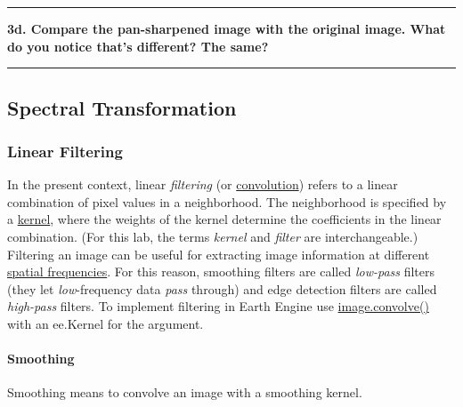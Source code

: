 \documentclass[
]{article}
\begin{document}
\begin{center}\rule{0.5\linewidth}{0.5pt}\end{center}

\textbf{3d. Compare the pan-sharpened image with the original image. What do you notice that's different? The same? }

\begin{center}\rule{0.5\linewidth}{0.5pt}\end{center}

\hypertarget{spectral-transformation}{%
\subsection{Spectral Transformation}\label{spectral-transformation}}

\hypertarget{linear-filtering}{%
\subsubsection{Linear Filtering}\label{linear-filtering}}

In the present context, linear \emph{filtering} (or \href{http://www.dspguide.com/ch24/1.htm}{convolution}) refers to a linear combination of pixel values in a neighborhood. The neighborhood is specified by a \href{https://en.wikipedia.org/wiki/Kernel_(image_processing)}{kernel}, where the weights of the kernel determine the coefficients in the linear combination. (For this lab, the terms \emph{kernel} and \emph{filter} are interchangeable.) Filtering an image can be useful for extracting image information at different \href{http://www.dspguide.com/ch24/5.htm}{spatial frequencies}. For this reason, smoothing filters are called \emph{low-pass} filters (they let \emph{low}-frequency data \emph{pass} through) and edge detection filters are called \emph{high-pass} filters. To implement filtering in Earth Engine use \href{https://developers.google.com/earth-engine/guides/image_convolutions}{image.convolve()} with an ee.Kernel for the argument.

\hypertarget{smoothing}{%
\paragraph{Smoothing}\label{smoothing}}

Smoothing means to convolve an image with a smoothing kernel.
\end{document}

